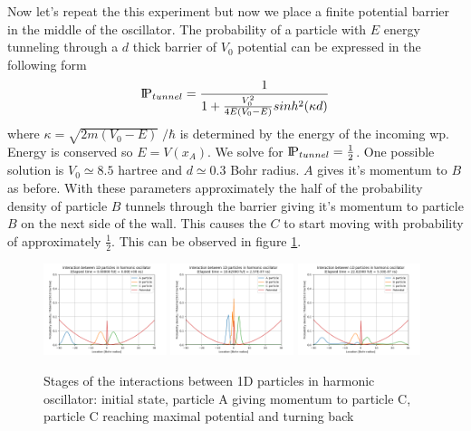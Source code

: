 Now let's repeat the this experiment but now we place a finite potential barrier in the middle of the oscillator.
The probability of a particle with $E$ energy tunneling through a $d$ thick barrier of $V_0$ potential can be expressed in the following form
\begin{equation}
	\label{eq:tunelling probability}
	\text{I\kern-0.15em P}_{tunnel} = \frac{1}{1 + \frac{V_0^2}{4E(V_0 - E)}sinh^2(\kappa d)}
\end{equation}
where $\kappa = \sqrt{2m(V_0 - E)}\;/\hbar$ is determined by the energy of the incoming \acrshort{wp}.
Energy is conserved so $E = V(x_A)$.
We solve for $\text{I\kern-0.15em P}_{tunnel} = \frac{1}{2}$.
One possible solution is $V_0 \simeq 8.5$ hartree and $d \simeq 0.3$ Bohr radius.
$A$ gives it's momentum to $B$ as before.
With these parameters approximately the half of the probability density of particle $B$ tunnels through the barrier giving it's momentum to particle $B$ on the next side of the wall.
This causes the $C$ to start moving with probability of approximately $\frac{1}{2}$.
This can be observed in figure \ref{fig:1d_osc_with_tunneling}.
\begin{figure}
	\begin{center}
		\includegraphics[width=0.32\textwidth]{figures/1d_oscillator_tunneling_01.png}
		\includegraphics[width=0.32\textwidth]{figures/1d_oscillator_tunneling_02.png}
		\includegraphics[width=0.32\textwidth]{figures/1d_oscillator_tunneling_03.png}
		\caption{Stages of the interactions between 1D particles in harmonic oscillator: initial state, particle A giving momentum to particle C, particle C reaching maximal potential and turning back}
		\label{fig:1d_osc_with_tunneling}
	\end{center}	
\end{figure}

